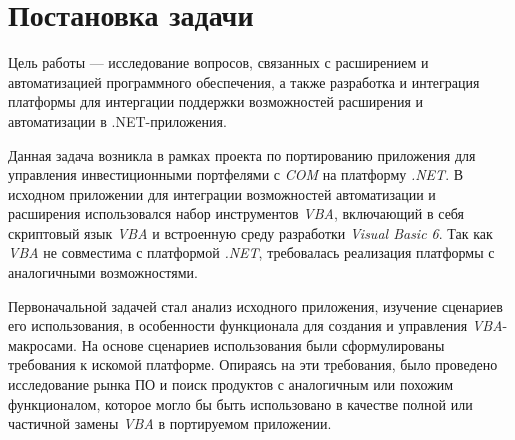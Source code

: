 \section{Постановка задачи}
\label{sec:problem_statement}

Цель работы --- исследование вопросов, связанных с расширением и автоматизацией программного обеспечения, а также разработка и интеграция платформы для интергации поддержки возможностей расширения и автоматизации в .NET-приложения.

Данная задача возникла в рамках проекта по портированию приложения для управления инвестиционными портфелями с {\it COM} на платформу {\it .NET}. В исходном приложении для интеграции возможностей автоматизации и расширения использовался набор инструментов {\it VBA}, включающий в себя скриптовый язык {\it VBA} и встроенную среду разработки {\it Visual Basic 6}. Так как {\it VBA} не совместима с платформой {\it .NET}, требовалась реализация платформы с аналогичными возможностями. 

Первоначальной задачей стал анализ исходного приложения, изучение сценариев его использования, в особенности функционала для создания и управления {\it VBA}-макросами. На основе сценариев использования были сформулированы требования к искомой платформе. Опираясь на эти требования, было проведено исследование рынка ПО и поиск продуктов с аналогичным или похожим функционалом, которое могло бы быть использовано в качестве полной или частичной замены {\it VBA} в портируемом приложении.

\pagebreak